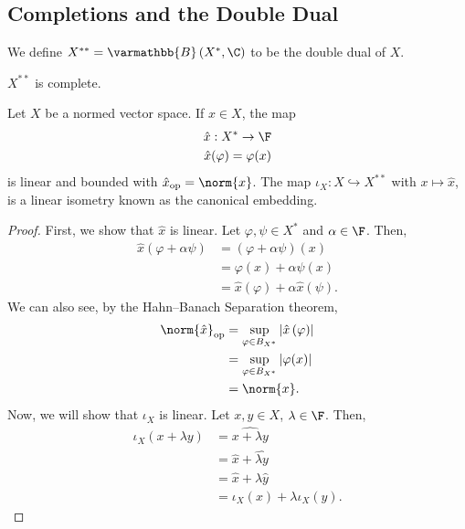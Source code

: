 \documentclass[10pt]{mypackage}
\renewcommand*{\mathbb}[1]{\varmathbb{#1}}
\newcommand{\B}{\mathbb{B}}
\begin{document}
\subsection{Completions and the Double Dual}%
\begin{definition}
We define $X^{\ast\ast} = \B\left(X^{\ast},\C\right)$ to be the double dual of $X$.
\end{definition}
\begin{remark}
$X^{\ast\ast}$ is complete.
\end{remark}
\begin{proposition}
  Let $X$ be a normed vector space. If $x\in X$, the map
  \begin{align*}
    \hat{x}: X^{\ast}\rightarrow \F\\
    \hat{x}(\varphi) = \varphi(x)
  \end{align*}
  is linear and bounded with $\hat{x}_{\text{op}} = \norm{x}$. The map $\iota_X: X\hookrightarrow X^{\ast\ast}$ with $x\mapsto \hat{x}$, is a linear isometry known as the canonical embedding.
\end{proposition}
\begin{proof}
  First, we show that $\hat{x}$ is linear. Let $\varphi,\psi\in X^{\ast}$ and $\alpha \in \F$. Then,
  \begin{align*}
    \hat{x}\left(\varphi + \alpha \psi\right) &= \left(\varphi + \alpha \psi\right)\left(x\right)\\
                                              &= \varphi(x) + \alpha\psi(x)\\
                                              &= \hat{x}\left(\varphi\right) + \alpha\hat{x}(\psi).
  \end{align*}
  We can also see, by the Hahn--Banach Separation theorem,
  \begin{align*}
    \norm{\hat{x}}_{\text{op}} &= \sup_{\varphi\in B_{X^{\ast}}}\left\vert \hat{x}\left(\varphi\right) \right\vert\\
                               &= \sup_{\varphi\in B_{X^{\ast}}} \left\vert \varphi(x) \right\vert\\
                               &= \norm{x}.
  \end{align*}
  Now, we will show that $\iota_X$ is linear. Let $x,y\in X$, $\lambda \in \F$. Then,
  \begin{align*}
    \iota_X\left(x + \lambda y\right) &= \widehat{x + \lambda y}\\
                                    &= \hat{x} + \widehat{\lambda y}\\
                                    &= \hat{x} + \lambda \hat{y}\\
                                    &= \iota_X\left(x\right) + \lambda\iota_X\left(y\right).
  \end{align*}
\end{proof}
\end{document}
